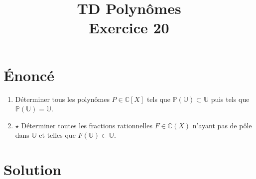 \documentclass[french]{article}
\title{TD Polynômes \\ Exercice 20}
\date{}
\renewcommand{\P}{\mathbb{P}}
\newcommand{\C}{\mathbb{C}}
\newcommand{\U}{\mathbb{U}}
\begin{document}
\maketitle

\section{Énoncé}
\begin{enumerate}
	\item Déterminer tous les polynômes $P\in\C[X]$ tels que $\P(\U)\subset\U$ puis tels que $\P(\U)=\U$.
	\item $\star$ Déterminer toutes les fractions rationnelles $F\in\C(X)$ n'ayant pas de pôle dans $\U$ et telles que $F(\U)\subset\U$.
\end{enumerate}
\section{Solution}
\end{document}

